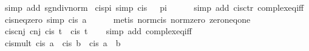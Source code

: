 \begin{isabellebody}
\ {\isacharparenleft}{\kern0pt}simp\ add{\isacharcolon}{\kern0pt}\ sgn{\isacharunderscore}{\kern0pt}div{\isacharunderscore}{\kern0pt}norm{\isacharparenright}{\kern0pt}%
\endisatagproof
{\isafoldproof}%
%
\isadelimproof
\isanewline
%
\endisadelimproof
\isanewline
{}\isamarkupfalse%
\ cis{\isacharunderscore}{\kern0pt}{}pi\ {\isacharbrackleft}{\kern0pt}simp{\isacharbrackright}{\kern0pt}{\isacharcolon}{\kern0pt}\ {\isachardoublequoteopen}cis\ {\isacharparenleft}{\kern0pt}{}\ {\isacharasterisk}{\kern0pt}\ pi{\isacharparenright}{\kern0pt}\ {\isacharequal}{\kern0pt}\ {}{\isachardoublequoteclose}\isanewline
%
\isadelimproof
\ \ %
\endisadelimproof
%
\isatagproof
{}\isamarkupfalse%
\ {\isacharparenleft}{\kern0pt}simp\ add{\isacharcolon}{\kern0pt}\ cis{\isachardot}{\kern0pt}ctr\ complex{\isacharunderscore}{\kern0pt}eq{\isacharunderscore}{\kern0pt}iff{\isacharparenright}{\kern0pt}%
\endisatagproof
{\isafoldproof}%
%
\isadelimproof
\isanewline
%
\endisadelimproof
\isanewline
{}\isamarkupfalse%
\ cis{\isacharunderscore}{\kern0pt}neq{\isacharunderscore}{\kern0pt}zero\ {\isacharbrackleft}{\kern0pt}simp{\isacharbrackright}{\kern0pt}{\isacharcolon}{\kern0pt}\ {\isachardoublequoteopen}cis\ a\ {\isasymnoteq}\ {}{\isachardoublequoteclose}\isanewline
%
\isadelimproof
\ \ %
\endisadelimproof
%
\isatagproof
{}\isamarkupfalse%
\ {\isacharparenleft}{\kern0pt}metis\ norm{\isacharunderscore}{\kern0pt}cis\ norm{\isacharunderscore}{\kern0pt}zero\ zero{\isacharunderscore}{\kern0pt}neq{\isacharunderscore}{\kern0pt}one{\isacharparenright}{\kern0pt}%
\endisatagproof
{\isafoldproof}%
%
\isadelimproof
\isanewline
%
\endisadelimproof
\isanewline
{}\isamarkupfalse%
\ cis{\isacharunderscore}{\kern0pt}cnj{\isacharcolon}{\kern0pt}\ {\isachardoublequoteopen}cnj\ {\isacharparenleft}{\kern0pt}cis\ t{\isacharparenright}{\kern0pt}\ {\isacharequal}{\kern0pt}\ cis\ {\isacharparenleft}{\kern0pt}{\isacharminus}{\kern0pt}t{\isacharparenright}{\kern0pt}{\isachardoublequoteclose}\isanewline
%
\isadelimproof
\ \ %
\endisadelimproof
%
\isatagproof
{}\isamarkupfalse%
\ {\isacharparenleft}{\kern0pt}simp\ add{\isacharcolon}{\kern0pt}\ complex{\isacharunderscore}{\kern0pt}eq{\isacharunderscore}{\kern0pt}iff{\isacharparenright}{\kern0pt}%
\endisatagproof
{\isafoldproof}%
%
\isadelimproof
\isanewline
%
\endisadelimproof
\isanewline
{}\isamarkupfalse%
\ cis{\isacharunderscore}{\kern0pt}mult{\isacharcolon}{\kern0pt}\ {\isachardoublequoteopen}cis\ a\ {\isacharasterisk}{\kern0pt}\ cis\ b\ {\isacharequal}{\kern0pt}\ cis\ {\isacharparenleft}{\kern0pt}a\ {\isacharplus}{\kern0pt}\ b{\isacharparenright}{\kern0pt}{\isachardoublequoteclose}\isanewline

\end{isabellebody}
